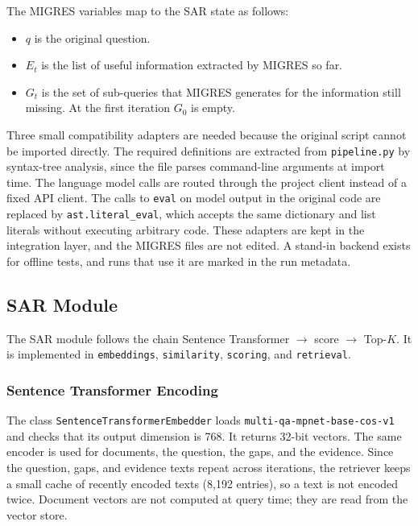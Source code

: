 \documentclass[12pt,a4paper]{report}
\begin{document}
The MIGRES variables map to the SAR state as follows:

\begin{itemize}[leftmargin=0.30in,itemsep=0.06in]
\item $q$ is the original question.
\item $E_t$ is the list of useful information extracted by MIGRES so far.
\item $G_t$ is the set of sub-queries that MIGRES generates for the information still missing. At the first iteration $G_0$ is empty.
\end{itemize}

Three small compatibility adapters are needed because the original script cannot be imported directly. The required definitions are extracted from \texttt{pipeline.py} by syntax-tree analysis, since the file parses command-line arguments at import time. The language model calls are routed through the project client instead of a fixed API client. The calls to \texttt{eval} on model output in the original code are replaced by \texttt{ast.literal\_eval}, which accepts the same dictionary and list literals without executing arbitrary code. These adapters are kept in the integration layer, and the MIGRES files are not edited. A stand-in backend exists for offline tests, and runs that use it are marked in the run metadata.

\subsection{SAR Module}

The SAR module follows the chain Sentence Transformer $\rightarrow$ score $\rightarrow$ Top-$K$. It is implemented in \texttt{embeddings}, \texttt{similarity}, \texttt{scoring}, and \texttt{retrieval}.

\subsubsection{Sentence Transformer Encoding}

The class \texttt{SentenceTransformerEmbedder} loads \texttt{multi-qa-mpnet-base-cos-v1} \cite{reimers2019sentence,st2020mpnet} and checks that its output dimension is 768. It returns 32-bit vectors. The same encoder is used for documents, the question, the gaps, and the evidence. Since the question, gaps, and evidence texts repeat across iterations, the retriever keeps a small cache of recently encoded texts (8,192 entries), so a text is not encoded twice. Document vectors are not computed at query time; they are read from the vector store.
\end{document}
